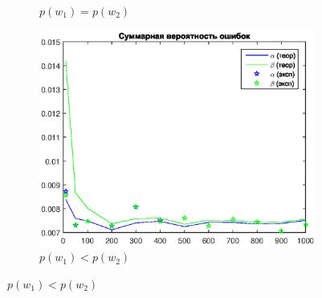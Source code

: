 \documentclass[10pt]{article} %
\begin{document}
\begin{spacing}{1}
\begin{figure}[h]
\begin{subfigure}{.5\textwidth}
		\caption{$p(w_1) = p(w_2)$}
	\end{subfigure}
	\begin{subfigure}{.5\textwidth}
		\centering
		\includegraphics[width=1.0\linewidth]{3.eps}
		\caption{$p(w_1) < p(w_2)$}
	\end{subfigure}
\end{figure}
~\\

\end{spacing}
\end{document}
